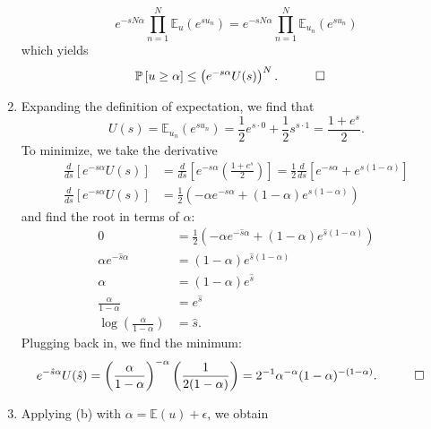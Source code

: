 \documentclass{amsart}
\begin{document}
\begin{solution}
\begin{enumerate}
\begin{equation*}
          e^{-sN\alpha} \prod_{n=1}^N \mathbb{E}_u\left(e^{su_n}\right)
          = e^{-sN\alpha} \prod_{n=1}^N \mathbb{E}_{u_n}\left(e^{su_n}\right)
      \end{equation*}
      which yields
      \begin{align*}
        \mathbb{P}\left[u \geq \alpha\right] &\leq
          \left(e^{-s\alpha} U(s)\right)^N. & &\qed
      \end{align*}
    \item Expanding the definition of expectation, we find that
      \begin{equation*}
        U(s) = \mathbb{E}_{u_n}(e^{su_n}) =
          \frac{1}{2} e^{s \cdot 0} + \frac{1}{2} s^{s \cdot 1} =
          \frac{1 + e^s}{2}.
      \end{equation*}
      To minimize, we take the derivative
      \begin{align*}
        \frac{d}{ds}\left[e^{-s\alpha} U(s)\right]
          &= \frac{d}{ds}\left[e^{-s\alpha}
            \left(\frac{1 + e^s}{2}\right)\right]
          = \frac{1}{2} \frac{d}{ds} \left[ e^{-s\alpha} +
            e^{s\left(1-\alpha\right)}\right] \\
        \frac{d}{ds}\left[e^{-s\alpha} U(s)\right]
          &= \frac{1}{2} \left( -\alpha e^{-s\alpha} +
            (1 - \alpha) e^{s(1-\alpha)}\right)
      \end{align*}
      and find the root in terms of \(\alpha\):
      \begin{align*}
        0 &= \frac{1}{2} \left( -\alpha e^{-\hat{s}\alpha} +
          (1 - \alpha) e^{\hat{s}(1-\alpha)}\right) \\
        \alpha e^{-\hat{s}\alpha} &= (1 - \alpha) e^{\hat{s}(1-\alpha)} \\
        \alpha &= (1 - \alpha) e^{\hat{s}} \\
        \frac{\alpha}{1-\alpha} &= e^{\hat{s}} \\
        \log \left(\frac{\alpha}{1-\alpha}\right) &= \hat{s}.
      \end{align*}
      Plugging back in, we find the minimum:
      \begin{align*}
        e^{-\hat{s}\alpha} U(\hat{s}) =
          \left(\frac{\alpha}{1-\alpha}\right)^{-\alpha}
          \left(\frac{1}{2(1 - \alpha)}\right) &=
          2^{-1} \alpha^{-\alpha} (1 - \alpha)^{-(1 - \alpha)}. & &\qed
      \end{align*}
    \item Applying (b) with \(\alpha = \mathbb{E}(u) + \epsilon\), we obtain

\end{enumerate}
\end{solution}
\end{document}
